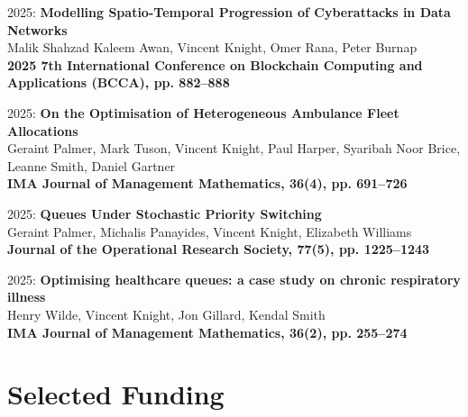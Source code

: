 \documentclass[10pt]{article}
\begin{document}
\begin{etaremune}
\item
  2025: \textbf{Modelling Spatio-Temporal Progression of Cyberattacks in Data Networks}\\
  Malik Shahzad Kaleem Awan, Vincent Knight, Omer Rana, Peter Burnap\\
  \textbf{2025 7th International Conference on Blockchain Computing and Applications (BCCA), pp. 882--888}\\

\item
  2025: \textbf{On the Optimisation of Heterogeneous Ambulance Fleet Allocations}\\
  Geraint Palmer, Mark Tuson, Vincent Knight, Paul Harper, Syaribah Noor Brice, Leanne Smith, Daniel Gartner\\
  \textbf{IMA Journal of Management Mathematics, 36(4), pp. 691--726}\\

\item
  2025: \textbf{Queues Under Stochastic Priority Switching}\\
  Geraint Palmer, Michalis Panayides, Vincent Knight, Elizabeth Williams\\
  \textbf{Journal of the Operational Research Society, 77(5), pp. 1225--1243}\\

\item
  2025: \textbf{Optimising healthcare queues: a case study on chronic respiratory illness}\\
  Henry Wilde, Vincent Knight, Jon Gillard, Kendal Smith\\
  \textbf{IMA Journal of Management Mathematics, 36(2), pp. 255--274}\\

\end{etaremune}

\section{Selected Funding}
\end{document}

